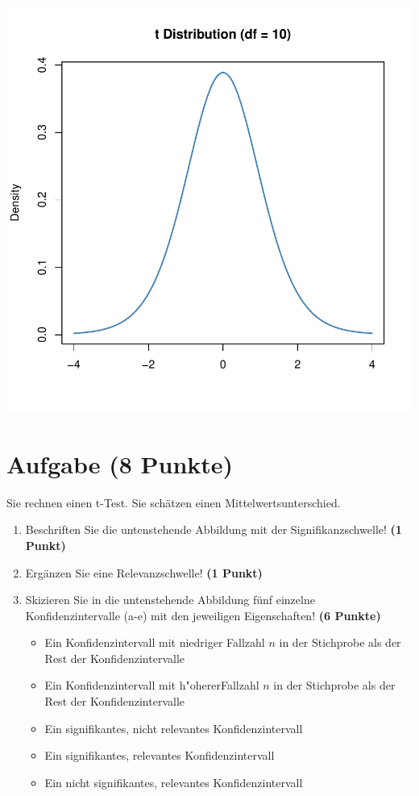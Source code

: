 \documentclass[a4paper, 10pt]{scrartcl}\usepackage[]{graphicx}\usepackage[]{color}
\makeatletter
\def\maxwidth{ %
  \ifdim\Gin@nat@width>\linewidth
    \linewidth
  \else
    \Gin@nat@width
  \fi
}
\makeatother
\begin{document}
{\centering \includegraphics[width=\maxwidth]{img/statistisches-testen-3-1} 

}


 
\clearpage

\section{Aufgabe \hfill (8 Punkte)}



Sie rechnen einen t-Test. Sie schätzen einen Mittelwertsunterschied. 

\begin{enumerate}
\item Beschriften Sie die untenstehende Abbildung mit der
  Signifikanzschwelle! \textbf{(1 Punkt)}
\item Erg{\"a}nzen Sie eine Relevanzschwelle! \textbf{(1 Punkt)} 
\item Skizieren Sie in die
  untenstehende Abbildung f{\"u}nf einzelne Konfidenzintervalle (a-e) mit den
  jeweiligen Eigenschaften! \textbf{(6 Punkte)}
  \begin{itemize}
  \item[(a)] Ein Konfidenzintervall mit niedriger Fallzahl $n$ in der Stichprobe als der Rest der Konfidenzintervalle 	
  \item[(b)] Ein Konfidenzintervall mit h{"o}hererFallzahl $n$ in der Stichprobe als der Rest der Konfidenzintervalle 	
  \item[(c)] Ein signifikantes, nicht relevantes Konfidenzintervall 	
  \item[(d)] Ein signifikantes, relevantes Konfidenzintervall 
  \item[(e)] Ein nicht signifikantes, relevantes Konfidenzintervall
  \end{itemize}
\end{enumerate}
\end{document}
